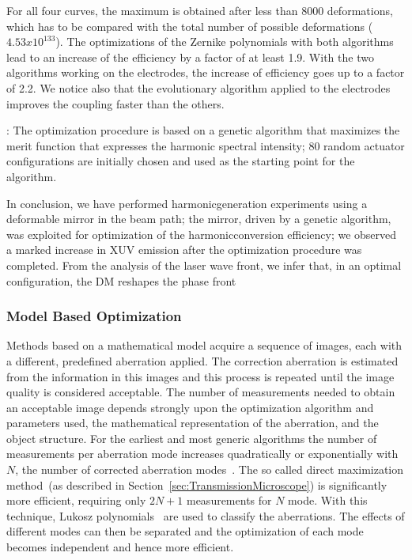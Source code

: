 For all four curves, the maximum is obtained after less than 8000 deformations, which has to be compared with the total number of possible deformations ($4.53x10^133$). The optimizations of the Zernike polynomials with both algorithms lead to an increase of the efficiency by a factor of at least 1.9. With the two algorithms working on the electrodes, the increase of efficiency goes up to a factor of 2.2. We notice also that the evolutionary algorithm applied to the electrodes improves the coupling faster than the others.

\cite{Genetic_Harmonic_optimization}:\newline
The optimization procedure is based on a genetic algorithm that maximizes the merit function that expresses the harmonic spectral intensity; 80 random actuator configurations are initially chosen and used as the starting point for the algorithm.

In conclusion, we have performed harmonicgeneration experiments using a deformable mirror in the beam path; the mirror, driven by a genetic algorithm, was exploited for optimization of the harmonicconversion efficiency; we observed a marked increase in XUV emission after the optimization procedure was completed. From the analysis of the laser wave front, we infer that, in an optimal configuration, the DM reshapes the phase front


\subsubsection{Model Based Optimization}
\label{sec:ModelBasedSensing}

Methods based on a mathematical model acquire a sequence of images, each with a different, predefined aberration applied. The correction aberration is estimated from the information in this images and this process is repeated until the image quality is considered acceptable. The number of measurements needed to obtain an acceptable image depends strongly upon the optimization algorithm and parameters used, the mathematical representation of the aberration, and the object structure. For the earliest and most generic algorithms the number of measurements per aberration mode increases quadratically or exponentially with $N$, the number of corrected aberration modes~\cite{wide_sphere_packing}. The so called direct maximization method~(as described in Section~\ref{sec:TransmissionMicroscope}) is significantly more efficient, requiring only $2N+1$ measurements for $N$ mode. With this technique, Lukosz polynomials~\cite{wide_Lukosz_Modes} are used to classify the aberrations. The effects of different modes can then be separated and the optimization of each mode becomes independent and hence more efficient.


